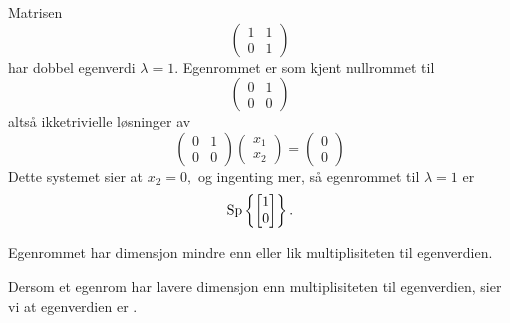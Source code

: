 \begin{ex}
Matrisen
\[
\begin{pmatrix}
1 & 1 \\ 0 &1
\end{pmatrix}
\]
har dobbel egenverdi $\lambda=1$. Egenrommet er som kjent nullrommet til 
\[
\begin{pmatrix}
0 & 1 \\ 0 &0
\end{pmatrix}
\]
altså ikketrivielle løsninger av 
\[
\begin{pmatrix}
0 & 1 \\ 0 &0
\end{pmatrix}
\begin{pmatrix}
x_1  \\ x_2
\end{pmatrix}
=
\begin{pmatrix}
0  \\ 0
\end{pmatrix}
\]
Dette systemet sier at
$
x_2=0,
$
og ingenting mer, så egenrommet til $\lambda=1$ er
\[
\operatorname{Sp} \left\{ \begin{bmatrix} 1 \\ 0 \end{bmatrix} \right\}.
\]
\end{ex}


\begin{thm}
Egenrommet har dimensjon mindre enn eller lik multiplisiteten til egenverdien. 
\end{thm}

Dersom et egenrom har lavere dimensjon enn multiplisiteten til egenverdien, sier vi at egenverdien er .




\kapittelslutt
